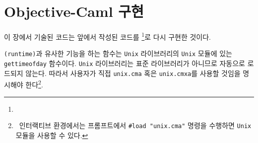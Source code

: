 \appendix
\chapter{Objective-Caml 구현}

이 장에서 기술된 코드는 앞에서  작성된 코드를 \OCAML\footnote{}로 다시 구현한
것이다.











  \texttt{(runtime)}과 유사한 기능을 하는 함수는
\texttt{Unix} 라이브러리의 \texttt{Unix} 모듈에 있는 \texttt{gettimeofday}
함수이다. \texttt{Unix} 라이브러리는 표준 라이브러리가 아니므로 자동으로
로드되지 않는다. 따라서 사용자가 직접 \texttt{unix.cma} 혹은
\texttt{unix.cmxa}를 사용할 것임을 명시해야 한다\footnote{\OCAML~인터랙티브
  환경에서는 프롬프트에서 \texttt{\#load "unix.cma"} 명령을 수행하면
  \texttt{Unix} 모듈을 사용할 수 있다.}.




